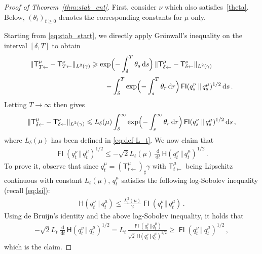 \documentclass[12pt]{article}
\newcommand{\1}{\mathds{1}}
\newcommand*{\rd}{\mathrm{d}}
\newcommand*{\dd}{\, \rd}
\newcommand{\mmid}{\,\Vert\,}
\DeclareMathOperator*{\FI}{\mathsf{FI}}
\renewcommand{\geq}{\geqslant}
\renewcommand{\ge}{\geqslant}
\renewcommand{\leq}{\leqslant}
\theoremstyle{plain}
\theoremstyle{definition}
\theoremstyle{remark}
\begin{document}
\begin{proof}[Proof of Theorem~\ref{thm:stab_ent}]
First, consider $\nu$ which also satisfies~\eqref{theta}. Below, $(\theta_t)_{t\ge 0}$ denotes the corresponding constants for $\mu$ only.

Starting from \eqref{eq:stab_start}, we directly apply Gr\"onwall's inequality  on the interval $[\delta,T]$ to obtain
\begin{align*}
    \|\mathsf T_{T\gets}^\mu - \mathsf T_{T\gets}^\nu\|_{L^2(\gamma)} &\geq \exp\Bigl(-\int_\delta^T \theta_s \dd s\Bigr)\,\|\mathsf T_{\delta\gets}^\mu - \mathsf T_{\delta\gets}^\nu\|_{L^2(\gamma)} 
    \\[0.25em]
    &\qquad{}- \int_\delta^T \exp\Bigl(-\int_s^T \theta_{r}\dd r\Bigr)\FI(q^\nu_{s}\mmid q^\mu_{s})^{1/2} \dd s\,.
\end{align*}
Letting $T \rightarrow \infty$ then gives
\begin{align}\label{eq:stab_FIs}
     \|\mathsf T_{\delta\gets}^{\mu} - \mathsf T_{\delta\gets}^{\nu}\|_{L^2(\gamma)} \leq L_\delta(\mu) \int_\delta^\infty \exp\Bigl(-\int_s^\infty \theta_{r}\dd r\Bigr) \FI(q^\nu_{s}\mmid q^\mu_{s})^{1/2}\dd s \,,
\end{align}
where $L_\delta(\mu)$ has been defined in \eqref{eq:def-L_t}.
We now claim that
\begin{align*}
    \FI(q^\nu_{t}\mmid q^\mu_{t})^{1/2} \leq -\sqrt{2}L_t(\mu)\, \frac{\dd}{\dd t}\, {\mathsf H}(q^\nu_{t}\mmid q^\mu_{t})^{1/2}\,.
\end{align*}
To prove it, observe that since $q_{t}^\mu = (\mathsf T^{\mu}_{t\gets})_{\sharp}\gamma$ with $\mathsf T^{\mu}_{t\gets}$ being Lipschitz continuous with constant $L_{t}(\mu)$,
$q_{t}^\mu$ satisfies the following log-Sobolev inequality (recall \eqref{eq:lsi}):
\begin{align*}
{\mathsf H}(q_{t}^\nu\mmid q_{t}^\mu) \leq \frac{L^2_{t}(\mu)}{2}\FI(q_{t}^\nu\mmid q_{t}^\mu)\,.
\end{align*}
Using de Bruijn's identity and the above log-Sobolev inequality, it holds that
\begin{align*}
    -\sqrt{2}L_t\, \frac{\dd}{\dd t}\, {\mathsf H}(q^\nu_{t}\mmid q^\mu_{t})^{1/2} 
    = L_t\, \frac{\FI(q_{t}^\nu\mmid q_{t}^\mu)}{\sqrt{2}\,{\mathsf H}(q^\nu_{t}\mmid q^\mu_{t})^{1/2} }
    \geq \FI(q^\nu_{t}\mmid q^\mu_{t})^{1/2}\,,
\end{align*}
which is the claim.


\end{proof}
\end{document}
